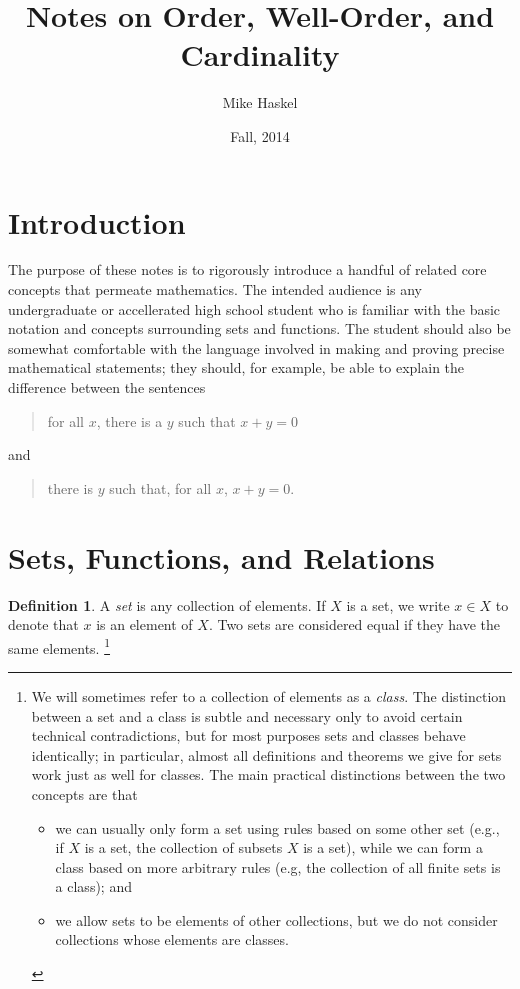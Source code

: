 \documentclass[letterpaper]{article}
\title{Notes on Order, Well-Order, and Cardinality}
\author{Mike Haskel}
\date{Fall, 2014}
\theoremstyle{definition}
\newtheorem{definition}[theorem]{Definition}
\newcommand{\defterm}{\emph}
\begin{document}
\maketitle

\section{Introduction}
The purpose of these notes is to rigorously introduce a handful of
related core concepts that permeate mathematics.  The intended
audience is any undergraduate or accellerated high school student who
is familiar with the basic notation and concepts surrounding sets and
functions.  The student should also be somewhat comfortable with the
language involved in making and proving precise mathematical
statements; they should, for example, be able to explain the
difference between the sentences
\begin{quote}
  for all $x$, there is a $y$ such that $x+y=0$
\end{quote}
and
\begin{quote}
  there is $y$ such that, for all $x$, $x+y=0$.
\end{quote}

\section{Sets, Functions, and Relations}

\begin{definition}
  A \defterm{set} is any collection of elements.  If \(X\) is a set,
  we write \(x \in X\) to denote that \(x\) is an element of \(X\).
  Two sets are considered equal if they have the same elements.
  \footnote{We will sometimes refer to a collection of elements as a
    \defterm{class}.  The distinction between a set and a class is
    subtle and necessary only to avoid certain technical
    contradictions, but for most purposes sets and classes behave
    identically; in particular, almost all definitions and theorems we
    give for sets work just as well for classes.  The main practical
    distinctions between the two concepts are that
    \begin{itemize}
      \item we can usually only form a set using rules based on some
        other set (e.g., if \(X\) is a set, the collection of subsets
        \(X\) is a set), while we can form a class based on more
        arbitrary rules (e.g, the collection of all finite sets is a
        class); and
      \item we allow sets to be elements of other collections, but we
        do not consider collections whose elements are classes.
    \end{itemize}}
\end{definition}
\end{document}

